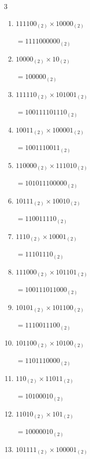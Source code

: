\begin{multicols}{3}
\begin{enumerate}
        $=100110100_{(2)}$

  \item $111100_{(2)} \times 10000_{(2)}$

        $=1111000000_{(2)}$

  \item $10000_{(2)} \times 10_{(2)}$

        $=100000_{(2)}$

\columnbreak %

\resetques

  \item $111110_{(2)} \times 101001_{(2)}$

        $=100111101110_{(2)}$

  \item $10011_{(2)} \times 100001_{(2)}$

        $=1001110011_{(2)}$

  \item $110000_{(2)} \times 111010_{(2)}$

        $=101011100000_{(2)}$

  \item $10111_{(2)} \times 10010_{(2)}$

        $=110011110_{(2)}$

  \item $1110_{(2)} \times 10001_{(2)}$

        $=11101110_{(2)}$

\columnbreak %

  \item $111000_{(2)} \times 101101_{(2)}$

        $=100111011000_{(2)}$

  \item $10101_{(2)} \times 101100_{(2)}$

        $=1110011100_{(2)}$

  \item $101100_{(2)} \times 10100_{(2)}$

        $=1101110000_{(2)}$

  \item $110_{(2)} \times 11011_{(2)}$

        $=10100010_{(2)}$

  \item $11010_{(2)} \times 101_{(2)}$

        $=10000010_{(2)}$

\columnbreak %

  \item $101111_{(2)} \times 100001_{(2)}$


\end{enumerate}
\end{multicols}
